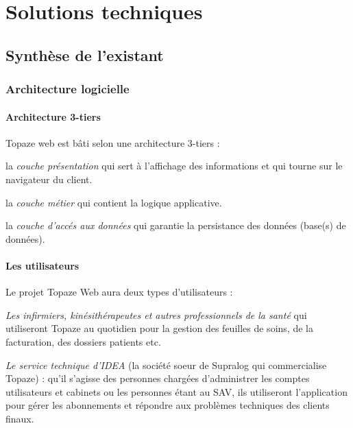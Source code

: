 \newpage
\section{Solutions techniques} %




\subsection{Synthèse de l'existant} %
\subsubsection{Architecture logicielle}
\paragraph*{Architecture 3-tiers\\}
Topaze web est bâti selon une architecture 3-tiers : 
\begin{sitemize}
\item la \textit{couche présentation} qui sert à l'affichage des informations et qui tourne sur le navigateur du client.
\item la \textit{couche métier} qui contient la logique applicative.
\item la \textit{couche d'accés aux données} qui garantie la persistance des données (base(s) de données). 
\end{sitemize}

\paragraph*{Les utilisateurs\\}
Le projet Topaze Web aura deux types d'utilisateurs : 
\begin{sitemize}
\item \textit{Les infirmiers, kinésithérapeutes et autres professionnels de la santé} qui utiliseront Topaze au quotidien pour la gestion des feuilles de soins, de la facturation, des dossiers patients etc. 
\item \textit{Le service technique d'IDEA} (la société soeur de Supralog qui commercialise Topaze) : qu’il s’agisse des personnes
chargées d’administrer les comptes utilisateurs et cabinets ou les personnes étant au SAV, ils
utiliseront l’application pour gérer les abonnements et répondre aux problèmes techniques des
clients finaux.
\end{sitemize}


